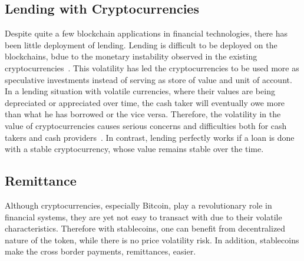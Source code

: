 \subsection{Lending with Cryptocurrencies}
Despite quite a few blockchain applications in financial technologies, there has been little deployment of lending.
Lending is difficult to be deployed on the blockchains, bdue to the monetary instability observed in the existing cryptocurrencies~\cite{okoyetoward}. This volatility has led the cryptocurrencies to be used more as speculative investments instead of serving as store of value and unit of account. In a lending situation with volatile currencies, where their values are being depreciated or appreciated over time, the cash taker will eventually owe more than what he has borrowed or the vice versa. Therefore, the volatility in the value of cryptocurrencies causes serious concerns and difficulties both for cash takers and cash providers~\cite{okoyetoward}. In contrast, lending perfectly works if a loan is done with a stable cryptocurrency, whose value remains stable over the time.

\subsection{Remittance}

Although cryptocurrencies, especially Bitcoin, play a revolutionary role in financial systems, they are yet not easy to transact with due to their volatile characteristics. Therefore with stablecoins, one can benefit from decentralized nature of the token, while there is no price volatility risk. In addition, stablecoins make the cross border payments, remittances, easier.



